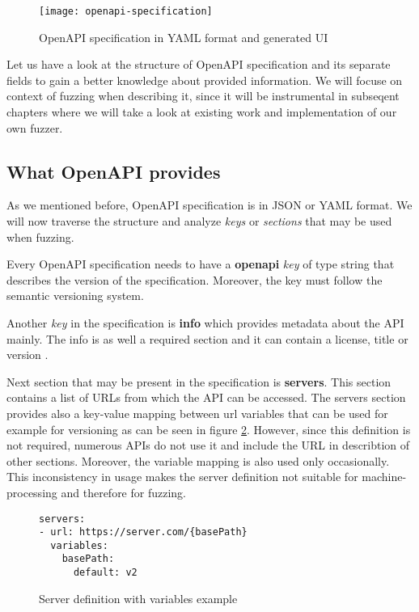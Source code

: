 \begin{figure}[h]
  \texttt{[image: openapi-specification]}
  \caption{OpenAPI specification in YAML format and generated UI}
  \label{fig:openapi-specification}
\end{figure}

Let us have a look at the structure of OpenAPI specification and its separate fields to gain a better knowledge about provided information. We will focuse on context of fuzzing when describing it, since it will be instrumental in subseqent chapters where we will take a look at existing work and implementation of our own fuzzer.

\subsection{What OpenAPI provides}
As we mentioned before, OpenAPI specification is in JSON or YAML format. We will now traverse the structure and analyze \textit{keys} or \textit{sections} that may be used when fuzzing.

Every OpenAPI specification needs to have a \textbf{openapi} \textit{key} of type string that describes the version of the specification. Moreover, the key must follow the semantic versioning system.

Another \textit{key} in the specification is \textbf{info} which provides metadata about the API mainly. The info is as well a required section and it can contain a license, title or version \cite{openapi2020github}.

Next section that may be present in the specification is \textbf{servers}. This section contains a list of URLs from which the API can be accessed. The servers section provides also a key-value mapping between url variables that can be used for example for versioning as can be seen in figure \ref{fig:Server definition with variables}. However, since this definition is not required, numerous APIs do not use it and include the URL in describtion of other sections. Moreover, the variable mapping is also used only occasionally. This inconsistency in usage makes the server definition not suitable for machine-processing and therefore for fuzzing.

\begin{figure}[h]
  \begin{verbatim}
servers:
- url: https://server.com/{basePath}
  variables:
    basePath:
      default: v2
  \end{verbatim}
  \caption{Server definition with variables example}
  \label{fig:Server definition with variables}
\end{figure}

